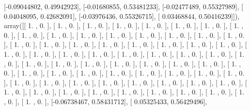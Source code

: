 \documentclass{article}
\begin{document}
       [-0.09044802,  0.49942923],
       [-0.01680855,  0.53481233],
       [-0.02477489,  0.55327989],
       [ 0.04048095,  0.42682091],
       [-0.03976436,  0.55326715],
       [ 0.03468844,  0.50416239]]), array([[ 1.        ,  0.        ],
       [ 1.        ,  0.        ],
       [ 1.        ,  0.        ],
       [ 1.        ,  0.        ],
       [ 1.        ,  0.        ],
       [ 1.        ,  0.        ],
       [ 1.        ,  0.        ],
       [ 1.        ,  0.        ],
       [ 1.        ,  0.        ],
       [ 1.        ,  0.        ],
       [ 1.        ,  0.        ],
       [ 1.        ,  0.        ],
       [ 1.        ,  0.        ],
       [ 1.        ,  0.        ],
       [ 1.        ,  0.        ],
       [ 1.        ,  0.        ],
       [ 1.        ,  0.        ],
       [ 1.        ,  0.        ],
       [ 1.        ,  0.        ],
       [ 1.        ,  0.        ],
       [ 1.        ,  0.        ],
       [ 1.        ,  0.        ],
       [ 1.        ,  0.        ],
       [ 1.        ,  0.        ],
       [ 1.        ,  0.        ],
       [ 1.        ,  0.        ],
       [ 1.        ,  0.        ],
       [ 1.        ,  0.        ],
       [ 1.        ,  0.        ],
       [ 1.        ,  0.        ],
       [ 1.        ,  0.        ],
       [ 1.        ,  0.        ],
       [ 1.        ,  0.        ],
       [ 1.        ,  0.        ],
       [ 1.        ,  0.        ],
       [ 1.        ,  0.        ],
       [ 1.        ,  0.        ],
       [ 1.        ,  0.        ],
       [ 1.        ,  0.        ],
       [ 1.        ,  0.        ],
       [ 1.        ,  0.        ],
       [ 1.        ,  0.        ],
       [ 1.        ,  0.        ],
       [ 1.        ,  0.        ],
       [ 1.        ,  0.        ],
       [ 1.        ,  0.        ],
       [ 1.        ,  0.        ],
       [ 1.        ,  0.        ],
       [ 1.        ,  0.        ],
       [ 1.        ,  0.        ],
       [ 1.        ,  0.        ],
       [ 1.        ,  0.        ],
       [ 1.        ,  0.        ],
       [ 1.        ,  0.        ],
       [ 1.        ,  0.        ],
       [ 1.        ,  0.        ],
       [ 1.        ,  0.        ],
       [ 1.        ,  0.        ],
       [ 1.        ,  0.        ],
       [ 1.        ,  0.        ],
       [ 1.        ,  0.        ],
       [ 1.        ,  0.        ],
       [ 1.        ,  0.        ],
       [ 1.        ,  0.        ],
       [ 1.        ,  0.        ],
       [ 1.        ,  0.        ],
       [ 1.        ,  0.        ],
       [-0.06738467,  0.58431712],
       [ 0.05325433,  0.56429496],
\end{document}

